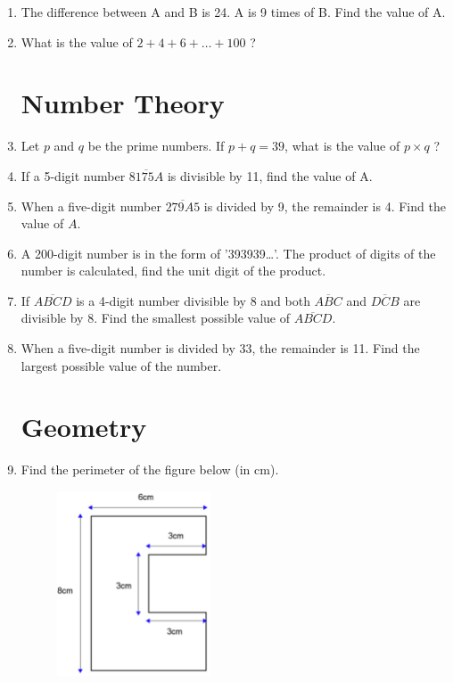 \documentclass[11pt]{scrartcl}
\begin{document}
\begin{enumerate}
    \vspace{10cm}\item The difference between A and B is 24. A is 9 times of B. Find the value of A.

    
    \vspace{10cm}\item What is the value of $2 + 4 + 6 + \ldots + 100$ ?

    \vspace{10cm}
    \section{Number Theory}
    \item Let $p$ and $q$ be the prime numbers. If $p+q=39$, what is the value of $p \times q$ ?
    
    \vspace{10cm}\item If a 5-digit number $\overline{8175A}$ is divisible by 11, find the value of A.

    \vspace{10cm}\item When a five-digit number $\overline{279A5}$ is divided by 9, the remainder is 4. Find the value of $A$.

    
    \newpage\item A 200-digit number is in the form of '393939\ldots'. The product of digits of the number is calculated, find the unit digit of the product.

    \vspace{10cm}\item If $\overline{ABCD}$ is a 4-digit number divisible by 8 and both $\overline{ABC}$ and $\overline{DCB}$ are divisible by 8. Find the smallest possible value of $\overline{ABCD}$.

    \newpage\item When a five-digit number is divided by 33, the remainder is 11. Find the largest possible value of the number.

    \newpage
    \section{Geometry}
    \item Find the perimeter of the figure below (in cm).
    \begin{figure}[h]
        \centering
        \includegraphics[width=0.43\textwidth]{StarGen/AIMO Trial G3-4 2024/perimeterC.png}
    \end{figure}


\end{enumerate}
\end{document}
